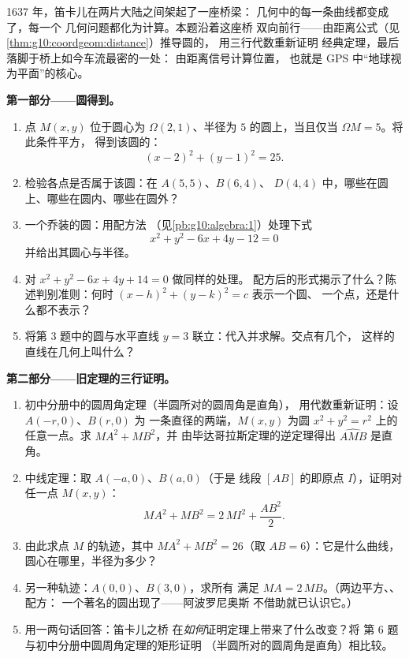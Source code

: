 \begin{problem}
\label{pb:g10:coordgeom:1}
1637 年，笛卡儿在两片大陆之间架起了一座桥梁：
几何中的每一条曲线都变成了\emph{}，每一个
几何问题都化为计算。本题沿着这座桥
双向前行——由距离公式（见\cref{thm:g10:coordgeom:distance}）推导圆的，
用三行代数重新证明
经典定理，最后落脚于桥上如今车流最密的一处：
由距离信号计算位置，
也就是 GPS 中“地球视为平面”的核心。

\medskip
\noindent\textbf{第一部分——圆得到。}
\begin{enumerate}
  \item 点 $M(x, y)$ 位于圆心为
        $\Omega(2, 1)$、半径为 $5$ 的圆上，当且仅当
        $\Omega M = 5$。将此条件平方，
        得到该圆的：
        \[
        (x - 2)^2 + (y - 1)^2 = 25 .
        \]
  \item 检验各点是否属于该圆：在 $A(5, 5)$、$B(6, 4)$、
        $D(4, 4)$ 中，哪些在圆上、哪些在圆内、哪些在圆外？
  \item 一个乔装的圆：用配方法
        （见\cref{pb:g10:algebra:1}）处理下式
        \[
        x^2 + y^2 - 6x + 4y - 12 = 0
        \]
        并给出其圆心与半径。
  \item 对 $x^2 + y^2 - 6x + 4y + 14 = 0$ 做同样的处理。
        配方后的形式揭示了什么？陈述判别准则：何时
        $(x - h)^2 + (y - k)^2 = c$ 表示一个圆、
        一个点，还是什么都不表示？
  \item 将第 3 题中的圆与水平直线
        $y = 3$ 联立：代入并求解。交点有几个，
        这样的直线在几何上叫什么？
\end{enumerate}

\medskip
\noindent\textbf{第二部分——旧定理的三行证明。}
\begin{enumerate}[resume]
  \item 初中分册中的圆周角定理（半圆所对的圆周角是直角），
        用代数重新证明：设 $A(-r, 0)$、$B(r, 0)$ 为
        一条直径的两端，$M(x, y)$ 为圆
        $x^2 + y^2 = r^2$ 上的任意一点。求 $MA^2 + MB^2$，并
        由毕达哥拉斯定理的逆定理得出
        $\widehat{AMB}$ 是直角。
  \item 中线定理：取 $A(-a, 0)$、$B(a, 0)$（于是
        线段 $[AB]$ 的即原点 $I$），证明对
        任一点 $M(x, y)$：
        \[
        MA^2 + MB^2 = 2\,MI^2 + \frac{AB^2}{2} .
        \]
  \item 由此求点 $M$ 的轨迹，其中
        $MA^2 + MB^2 = 26$（取 $AB = 6$）：它是什么曲线，
        圆心在哪里，半径为多少？
  \item 另一种轨迹：$A(0,0)$、$B(3,0)$，求所有
        满足 $MA = 2\,MB$。（两边平方、、配方：
        一个著名的圆出现了——阿波罗尼奥斯
        不借助就已认识它。）
  \item 用一两句话回答：笛卡儿之桥
        在\emph{如何}证明定理上带来了什么改变？将
        第 6 题与初中分册中圆周角定理的矩形证明
        （半圆所对的圆周角是直角）相比较。
\end{enumerate}


\end{problem}

